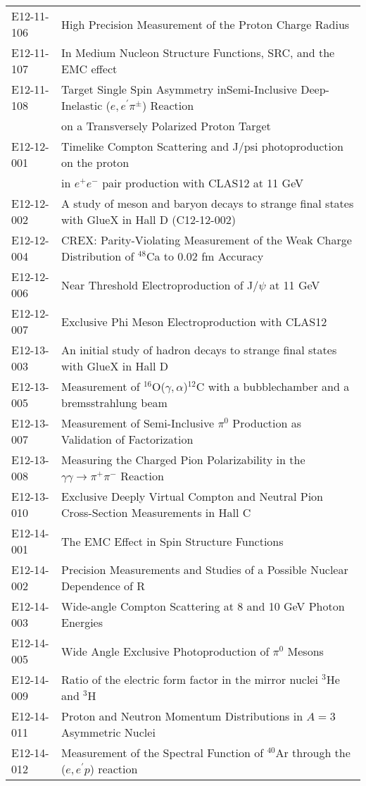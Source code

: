 \begin{tabular}{ll}
E12-11-106 & High Precision Measurement of the Proton Charge Radius\\
E12-11-107 & In Medium Nucleon Structure Functions, SRC, and the EMC effect\\
E12-11-108 & Target Single Spin Asymmetry inSemi-Inclusive Deep-Inelastic ($e,e^\prime\pi^\pm$) Reaction\\
& on a Transversely Polarized Proton Target\\
E12-12-001 & Timelike Compton Scattering and J/psi photoproduction on the proton\\
& in $e^+e^-$ pair production with CLAS12 at 11 GeV\\
E12-12-002 & A study of meson and baryon decays to strange final states with GlueX in Hall D (C12-12-002)\\
E12-12-004 & CREX: Parity-Violating Measurement of the Weak Charge Distribution of $^{48}$Ca to 0.02 fm Accuracy\\
E12-12-006 & Near Threshold Electroproduction of J/$\psi$ at 11 GeV\\
E12-12-007 & Exclusive Phi Meson Electroproduction with CLAS12\\
E12-13-003 & An initial study of hadron decays to strange final states with GlueX in Hall D\\
E12-13-005 & Measurement of $^{16}$O($\gamma,\alpha$)$^{12}$C with a bubblechamber and a bremsstrahlung beam\\
E12-13-007 & Measurement of Semi-Inclusive $\pi^0$ Production as Validation of Factorization\\
E12-13-008 & Measuring the Charged Pion Polarizability in the $\gamma \gamma \rightarrow \pi^+ \pi^-$ Reaction\\
E12-13-010 & Exclusive Deeply Virtual Compton and Neutral Pion Cross-Section Measurements in Hall C\\
E12-14-001 & The EMC Effect in Spin Structure Functions\\
E12-14-002 & Precision Measurements and Studies of a Possible Nuclear Dependence of R\\
E12-14-003 & Wide-angle Compton Scattering at 8 and 10 GeV Photon Energies\\
E12-14-005 & Wide Angle Exclusive Photoproduction of $\pi^0$ Mesons\\
E12-14-009 & Ratio of the electric form factor in the mirror nuclei $^3$He and $^3$H\\
E12-14-011 & Proton and Neutron Momentum Distributions in $A=3$ Asymmetric Nuclei\\
E12-14-012 & Measurement of the Spectral Function of $^{40}$Ar through the ($e,e^\prime p$) reaction
\end{tabular}

